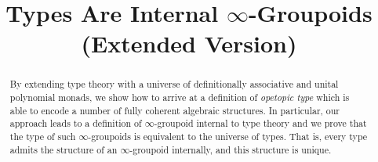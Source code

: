 \documentclass[conference,10pt]{IEEEtran}
\begin{document}
\setlength{\abovedisplayskip}{6pt}
\setlength{\belowdisplayskip}{6pt}

\title{Types Are Internal $\infty$-Groupoids\\(Extended Version)}
\author{
  \and
  \and
}

\maketitle

\begin{abstract}
  By extending type theory with a universe of definitionally
  associative and unital polynomial monads, we show how to arrive at a
  definition of \emph{opetopic type} which is able to encode a number
  of fully coherent algebraic structures.  In particular, our approach
  leads to a definition of $\infty$-groupoid internal to type theory
  and we prove that the type of such $\infty$-groupoids is equivalent
  to the universe of types.  That is, every type admits the structure
  of an $\infty$-groupoid internally, and this structure is unique.
\end{abstract}

%
\IEEEpeerreviewmaketitle











\appendix


\end{document}

